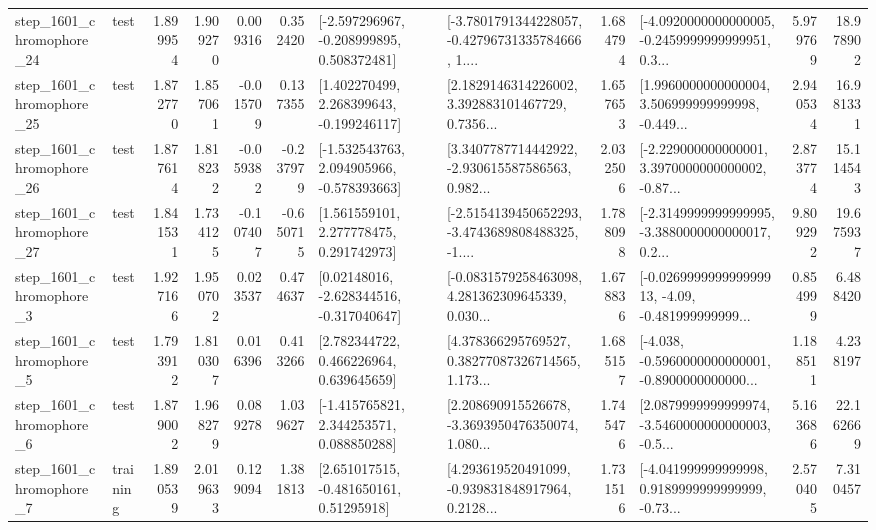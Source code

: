 \begin{tabular}{llrrrrllrlrr}
 step\_1601\_chromophore\_24 &      test &      1.899954 &    1.909270 &      0.009316 &  0.352420 &   [-2.597296967, -0.208999895, 0.508372481] &  [-3.7801791344228057, -0.42796731335784666, 1.... &       1.684794 &  [-4.0920000000000005, -0.2459999999999951, 0.3... &            5.979769 &         18.978902 \\
 step\_1601\_chromophore\_25 &      test &      1.872770 &    1.857061 &     -0.015709 &  0.137355 &    [1.402270499, 2.268399643, -0.199246117] &  [2.1829146314226002, 3.392883101467729, 0.7356... &       1.657653 &  [1.9960000000000004, 3.506999999999998, -0.449... &            2.940534 &         16.981331 \\
 step\_1601\_chromophore\_26 &      test &      1.877614 &    1.818232 &     -0.059382 & -0.237979 &   [-1.532543763, 2.094905966, -0.578393663] &  [3.3407787714442922, -2.930615587586563, 0.982... &       2.032506 &  [-2.229000000000001, 3.3970000000000002, -0.87... &            2.873774 &         15.114543 \\
 step\_1601\_chromophore\_27 &      test &      1.841531 &    1.734125 &     -0.107407 & -0.650715 &     [1.561559101, 2.277778475, 0.291742973] &  [-2.5154139450652293, -3.4743689808488325, -1.... &       1.788098 &  [-2.3149999999999995, -3.3880000000000017, 0.2... &            9.809292 &         19.675937 \\
  step\_1601\_chromophore\_3 &      test &      1.927166 &    1.950702 &      0.023537 &  0.474637 &    [0.02148016, -2.628344516, -0.317040647] &  [-0.0831579258463098, 4.281362309645339, 0.030... &       1.678836 &  [-0.026999999999999913, -4.09, -0.481999999999... &            0.854999 &          6.488420 \\
  step\_1601\_chromophore\_5 &      test &      1.793912 &    1.810307 &      0.016396 &  0.413266 &     [2.782344722, 0.466226964, 0.639645659] &  [4.378366295769527, 0.38277087326714565, 1.173... &       1.685157 &  [-4.038, -0.5960000000000001, -0.8900000000000... &            1.188511 &          4.238197 \\
  step\_1601\_chromophore\_6 &      test &      1.879002 &    1.968279 &      0.089278 &  1.039627 &    [-1.415765821, 2.344253571, 0.088850288] &  [2.208690915526678, -3.3693950476350074, 1.080... &       1.745476 &  [2.0879999999999974, -3.5460000000000003, -0.5... &            5.163686 &         22.162669 \\
  step\_1601\_chromophore\_7 &  training &      1.890539 &    2.019633 &      0.129094 &  1.381813 &     [2.651017515, -0.481650161, 0.51295918] &  [4.293619520491099, -0.939831848917964, 0.2128... &       1.731516 &  [-4.041999999999998, 0.9189999999999999, -0.73... &            2.570405 &          7.310457 \\

\end{tabular}

